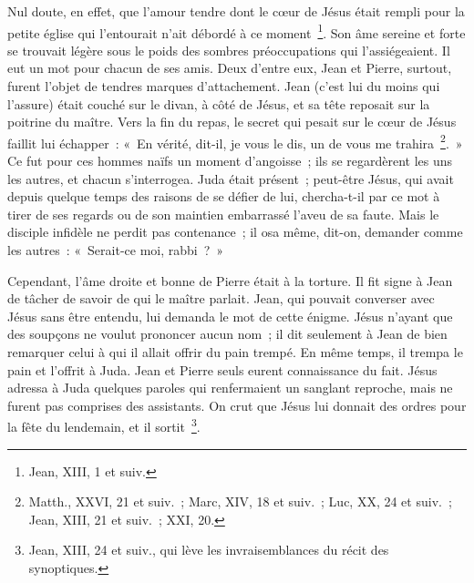 \documentclass[french,twoside]{book} %
\begin{document}
Nul doute, en effet, que l’amour tendre dont le cœur de Jésus était rempli pour la petite église qui l’entourait n’ait débordé à ce moment \footnote{Jean, XIII, 1 et suiv.}. Son âme sereine et forte se trouvait légère sous le poids des sombres préoccupations qui l’assiégeaient. Il eut un mot pour chacun de ses amis. Deux d’entre eux, Jean et Pierre, surtout, furent l’objet de tendres marques d’attachement. Jean (c’est lui du moins qui l’assure) était couché sur le divan, à côté de Jésus, et sa tête reposait sur la poitrine du maître. Vers la fin du repas, le secret qui pesait sur le cœur de Jésus faillit lui échapper : « En vérité, dit-il, je vous le dis, un de vous me trahira \footnote{Matth., XXVI, 21 et suiv. ; Marc, XIV, 18 et suiv. ; Luc, XX, 24 et suiv. ; Jean, XIII, 21 et suiv. ; XXI, 20.}. » Ce fut pour ces hommes naïfs un moment d’angoisse ; ils se regardèrent les uns les autres, et chacun s’interrogea. Juda était présent ; peut-être Jésus, qui avait depuis quelque temps des raisons de se défier de lui, chercha-t-il par ce mot à tirer de ses regards ou de son maintien embarrassé l’aveu de sa faute. Mais le disciple infidèle ne perdit pas contenance ; il osa même, dit-on, demander comme les autres : « Serait-ce moi, rabbi ? »\par
Cependant, l’âme droite et bonne de Pierre était à la torture. Il fit signe à Jean de tâcher de savoir de qui le maître parlait. Jean, qui pouvait converser avec Jésus sans être entendu, lui demanda le mot de cette énigme. Jésus n’ayant que des soupçons ne voulut prononcer aucun nom ; il dit seulement à Jean de bien remarquer celui à qui il allait offrir du pain trempé. En même temps, il trempa le pain et l’offrit à Juda. Jean et Pierre seuls eurent connaissance du fait. Jésus adressa à Juda quelques paroles qui renfermaient un sanglant reproche, mais ne furent pas comprises des assistants. On crut que Jésus lui donnait des ordres pour la fête du lendemain, et il sortit \footnote{Jean, XIII, 24 et suiv., qui lève les invraisemblances du récit des synoptiques.}.\par
\end{document}
